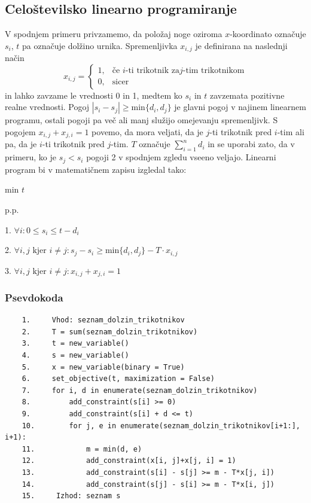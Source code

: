 \documentclass[a4paper,12pt]{article}
\theoremstyle{definition}
\theoremstyle{plain}
\begin{document}
\subsection{Celoštevilsko linearno programiranje}
V spodnjem primeru privzamemo, da položaj noge oziroma $x$-koordinato označuje $s_i$, $t$ pa označuje dolžino urnika. Spremenljivka $x_{i,j}$ je definirana na naslednji način
$$
x_{i,j} =
\left\{
	\begin{array}{ll}
		1,  & \mbox{če } i\text{-ti trikotnik za} j\text{-tim trikotnikom} \\
		0,  & \mbox{sicer } 
	\end{array}
\right.
$$
in lahko zavzame le vrednosti 0 in 1, medtem ko $s_i$ in $t$ zavzemata pozitivne realne vrednosti. Pogoj $|s_i-s_j| \geq \text{min}\{d_i,d_j\}$ je glavni pogoj v najinem linearnem programu, ostali pogoji pa več ali manj služijo omejevanju spremenljivk.
\newpage
S pogojem $x_{i,j}+x_{j,i}=1$ povemo, da mora veljati, da je $j$-ti trikotnik pred $i$-tim ali pa, da je $i$-ti trikotnik pred $j$-tim.
$T$ označuje $\sum_{i=1}^n d_i$ in se uporabi zato, da v primeru, ko je $s_j < s_i$ pogoji 2 v spodnjem zgledu vseeno veljajo.
Linearni program bi v matematičnem zapisu izgledal tako:
\begin{center}
    min $t$

    p.p.

    1.  $\forall i: 0 \leq s_i \leq t-d_i$

    \medskip

    2.  $\forall i,j \text{ kjer } i\neq j: s_j - s_i \geq \text{min}\{d_i,d_j\}-T\cdot x_{i,j}$
    \medskip

    3.  $\forall i,j \text{ kjer } i\neq j: x_{i,j}+x_{j,i}=1$
\end{center}
\subsubsection{Psevdokoda}
\begin{verbatim}
    1.     Vhod: seznam_dolzin_trikotnikov
    2.     T = sum(seznam_dolzin_trikotnikov)
    3.     t = new_variable()
    4.     s = new_variable()
    5.     x = new_variable(binary = True)
    6.     set_objective(t, maximization = False)
    7.     for i, d in enumerate(seznam_dolzin_trikotnikov)
    8.         add_constraint(s[i] >= 0)
    9.         add_constraint(s[i] + d <= t)
    10.        for j, e in enumerate(seznam_dolzin_trikotnikov[i+1:], i+1):
    11.            m = min(d, e)
    12.            add_constraint(x[i, j]+x[j, i] = 1)
    13.            add_constraint(s[i] - s[j] >= m - T*x[j, i])
    14.            add_constraint(s[j] - s[i] >= m - T*x[i, j])
    15.     Izhod: seznam s
\end{verbatim}
\end{document}
